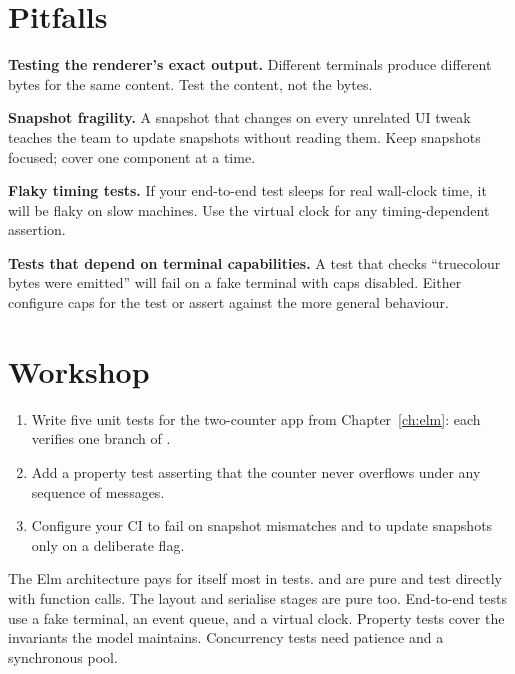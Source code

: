 \section{Pitfalls}

\begin{warning}
\textbf{Testing the renderer's exact output.} Different
terminals produce different bytes for the same content. Test
the content, not the bytes.
\end{warning}

\begin{warning}
\textbf{Snapshot fragility.} A snapshot that changes on every
unrelated UI tweak teaches the team to update snapshots without
reading them. Keep snapshots focused; cover one component at a
time.
\end{warning}

\begin{warning}
\textbf{Flaky timing tests.} If your end-to-end test sleeps for
real wall-clock time, it will be flaky on slow machines. Use
the virtual clock for any timing-dependent assertion.
\end{warning}

\begin{warning}
\textbf{Tests that depend on terminal capabilities.} A test
that checks ``truecolour bytes were emitted'' will fail on a
fake terminal with caps disabled. Either configure caps for
the test or assert against the more general behaviour.
\end{warning}

\section*{Workshop}

\begin{enumerate}[leftmargin=*]
  \item Write five unit tests for the two-counter app from
    Chapter~\ref{ch:elm}: each verifies one branch of
    .
  \item Add a property test asserting that the counter never
    overflows under any sequence of messages.
  \item Configure your CI to fail on snapshot mismatches and to
    update snapshots only on a deliberate flag.
\end{enumerate}

\begin{recap}
The Elm architecture pays for itself most in tests.
 and  are pure and test directly with
function calls. The layout and serialise stages are pure too.
End-to-end tests use a fake terminal, an event queue, and a
virtual clock. Property tests cover the invariants the model
maintains. Concurrency tests need patience and a synchronous
pool.
\end{recap}
